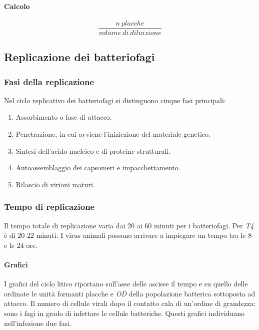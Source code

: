 			\paragraph{Calcolo}
			\[\dfrac{n\ placche}{volume\ di\ diluizione}\]
	
	\subsection{Replicazione dei batteriofagi}

		\subsubsection{Fasi della replicazione}
		Nel ciclo replicativo dei batteriofagi si distinguono cinque fasi principali:
		\begin{multicols}{2}
			\begin{enumerate}
    				\item Assorbimento o fase di attacco.
    				\item Penetrazione, in cui avviene l'iniziezione del materiale genetico.
    				\item Sintesi dell'acido nucleico e di proteine strutturali.
    				\item Autoassemblaggio dei capsomeri e impacchettamento.
    				\item Rilascio di virioni maturi. 
			\end{enumerate}
		\end{multicols}

		\subsubsection{Tempo di replicazione}
		Il tempo totale di replicazione varia dai $20$ ai $60$ minuti per i batteriofagi.
		Per \emph{T4} \`e di $20$-$22$ minuti.
		I virus animali possono arrivare a impiegare un tempo tra le $8$ e le $24$ ore.

			\paragraph{Grafici}
			I grafici del ciclo litico riportano sull'asse delle ascisse il tempo e su quello delle ordinate le unit\`a formanti placche e \emph{OD} della popolazione batterica sottoposta ad attacco.
			Il numero di cellule virali dopo il contatto cala di un'ordine di grandezza: sono i fagi in grado di infettare le cellule batteriche.
			Questi grafici individuano nell'infezione due fasi.

